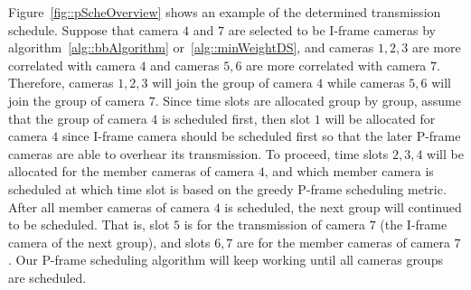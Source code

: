 Figure~\ref{fig::pScheOverview} shows an example of the determined transmission schedule.
Suppose that camera $4$ and $7$ are selected to be I-frame cameras by algorithm~\ref{alg::bbAlgorithm} or~\ref{alg::minWeightDS}, and cameras $1,2,3$ are more correlated with camera $4$ and cameras $5,6$ are more correlated with camera $7$.
Therefore, cameras $1,2,3$ will join the group of camera $4$ while cameras $5,6$ will join the group of camera $7$.
Since time slots are allocated group by group, assume that the group of camera $4$ is scheduled first, then slot $1$ will be allocated for camera $4$ since I-frame camera should be scheduled first so that the later P-frame cameras are able to overhear its transmission.
To proceed, time slots $2,3,4$ will be allocated for the member cameras of camera $4$, and which member camera is scheduled at which time slot is based on the greedy P-frame scheduling metric.
After all member cameras of camera $4$ is scheduled, the next group will continued to be scheduled.
That is, slot $5$ is for the transmission of camera $7$ (the I-frame camera of the next group), and slots $6,7$ are for the member cameras of camera $7$.
Our P-frame scheduling algorithm will keep working until all cameras groups are scheduled.
%
%
%